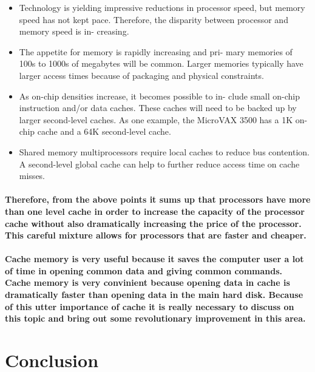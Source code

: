 \documentclass{article}
\begin{document}
\begin{itemize}

    \item Technology is yielding impressive reductions in processor
    speed, but memory speed has not kept pace. Therefore,
    the disparity between processor and memory speed is in-
    creasing.

    \item The appetite for memory is rapidly increasing and pri-
    mary memories of 100s to 1000s of megabytes will be
    common. Larger memories typically have larger access
    times because of packaging and physical constraints.

    \item As on-chip densities increase, it becomes possible to in-
    clude small on-chip instruction and/or data caches. These caches will need to be backed up by larger
    second-level caches. As one example, the MicroVAX 3500
    has a 1K on-chip cache and a 64K second-level cache.

    \item Shared memory multiprocessors require local caches to
    reduce bus contention. A second-level global cache can
    help to further reduce access time on cache misses.
    
\end{itemize}

\paragraph{Therefore, from the above points it sums up that processors have more than
 one level cache in order to increase the capacity of the processor cache without also
 dramatically increasing the price of the processor. This careful mixture allows for 
 processors that are faster and cheaper. 
}

\paragraph{Cache memory is very useful because it saves the computer user a lot of time in 
    opening common data and giving common commands. Cache memory is very convinient 
    because opening data in cache is dramatically faster than opening data in the main 
    hard disk. Because of this utter importance of cache it is really necessary to discuss 
    on this topic and bring out some revolutionary improvement in this area.
}


\section{Conclusion}
\end{document}

